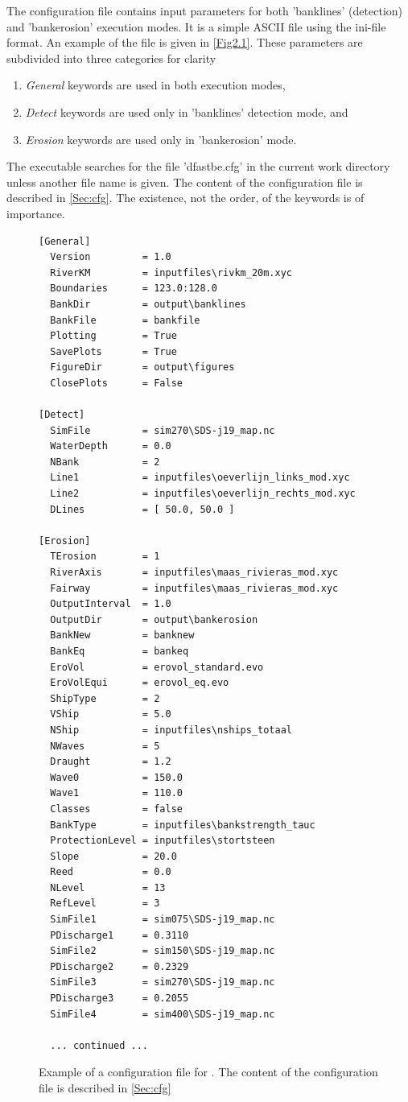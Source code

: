 The configuration file contains input parameters for both 'banklines' (detection) and 'bankerosion' execution modes.
It is a simple ASCII file using the ini-file format.
An example of the file is given in \autoref{Fig2.1}.
These parameters are subdivided into three categories for clarity

\begin{enumerate}
\item \emph{General} keywords are used in both execution modes,
\item \emph{Detect} keywords are used only in 'banklines' detection mode, and
\item \emph{Erosion} keywords are used only in 'bankerosion' mode.
\end{enumerate}

The executable searches for the file 'dfastbe.cfg' in the current work directory unless another file name is given.
The content of the configuration file is described in \autoref{Sec:cfg}.
The existence, not the order, of the keywords is of importance.

\begin{figure}
\begin{verbatim}
[General]
  Version         = 1.0
  RiverKM         = inputfiles\rivkm_20m.xyc
  Boundaries      = 123.0:128.0
  BankDir         = output\banklines
  BankFile        = bankfile
  Plotting        = True
  SavePlots       = True
  FigureDir       = output\figures
  ClosePlots      = False

[Detect]
  SimFile         = sim270\SDS-j19_map.nc
  WaterDepth      = 0.0
  NBank           = 2
  Line1           = inputfiles\oeverlijn_links_mod.xyc
  Line2           = inputfiles\oeverlijn_rechts_mod.xyc
  DLines          = [ 50.0, 50.0 ]

[Erosion]
  TErosion        = 1
  RiverAxis       = inputfiles\maas_rivieras_mod.xyc
  Fairway         = inputfiles\maas_rivieras_mod.xyc
  OutputInterval  = 1.0
  OutputDir       = output\bankerosion
  BankNew         = banknew
  BankEq          = bankeq
  EroVol          = erovol_standard.evo
  EroVolEqui      = erovol_eq.evo
  ShipType        = 2
  VShip           = 5.0
  NShip           = inputfiles\nships_totaal
  NWaves          = 5
  Draught         = 1.2
  Wave0           = 150.0
  Wave1           = 110.0
  Classes         = false
  BankType        = inputfiles\bankstrength_tauc
  ProtectionLevel = inputfiles\stortsteen
  Slope           = 20.0
  Reed            = 0.0
  NLevel          = 13
  RefLevel        = 3
  SimFile1        = sim075\SDS-j19_map.nc
  PDischarge1     = 0.3110
  SimFile2        = sim150\SDS-j19_map.nc
  PDischarge2     = 0.2329
  SimFile3        = sim270\SDS-j19_map.nc
  PDischarge3     = 0.2055
  SimFile4        = sim400\SDS-j19_map.nc

  ... continued ...
\end{verbatim}
\caption{Example of a configuration file for \dfastbe. The content of the configuration file is described in \autoref{Sec:cfg}}
\label{Fig2.1}
\end{figure}

